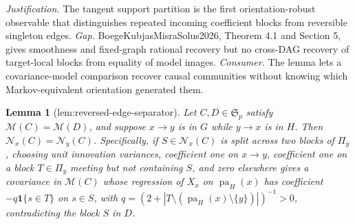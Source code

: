\documentclass{article}
\newtheorem{lemma}{Lemma}
\begin{document}
\par\smallskip\noindent \textit{Justification.} The tangent support partition is the first orientation-robust observable that distinguishes repeated incoming coefficient blocks from reversible singleton edges. \textit{Gap.} BoegeKubjasMisraSolus2026, Theorem 4.1 and Section 5, gives smoothness and fixed-graph rational recovery but no cross-DAG recovery of target-local blocks from equality of model images. \textit{Consumer.} The lemma lets a covariance-model comparison recover causal communities without knowing which Markov-equivalent orientation generated them.

\begin{lemma}[lem:reversed-edge-separator]\label{lem:reversed-edge-separator}
Let \(C,D\in\mathfrak S_p\) satisfy \(\mathcal M(C)=\mathcal M(D)\), and suppose \(x\to y\) is in \(G\) while \(y\to x\) is in \(H\). Then \(\mathcal N_x(C)=\mathcal N_y(C)\). Specifically, if \(S\in\mathcal N_x(C)\) is split across two blocks of \(\Pi_y\), choosing unit innovation variances, coefficient one on \(x\to y\), coefficient one on a block \(T\in\Pi_y\) meeting but not containing \(S\), and zero elsewhere gives a covariance in \(\mathcal M(C)\) whose regression of \(X_x\) on \(\operatorname{pa}_H(x)\) has coefficient \(-q\mathbf 1\{s\in T\}\) on \(s\in S\), with \(q=(2+|T\setminus(\operatorname{pa}_H(x)\setminus\{y\})|)^{-1}>0\), contradicting the block \(S\) in \(D\).
\end{lemma}
\end{document}
